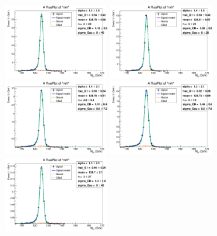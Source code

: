 \begin{figure}
	\begin{center}
		\includegraphics[width=0.40\textwidth]{fig/signal_fit/2017/sigfit_mu_ggF_1_125.png}
		\includegraphics[width=0.40\textwidth]{fig/signal_fit/2017/sigfit_mu_ggF_2_125.png}\\
		\includegraphics[width=0.40\textwidth]{fig/signal_fit/2017/sigfit_mu_ggF_3_125.png}
		\includegraphics[width=0.40\textwidth]{fig/signal_fit/2017/sigfit_mu_ggF_4_125.png}\\
		\includegraphics[width=0.40\textwidth]{fig/signal_fit/2017/sigfit_mu_VBF_501_125.png}

\end{center}
\end{figure}
